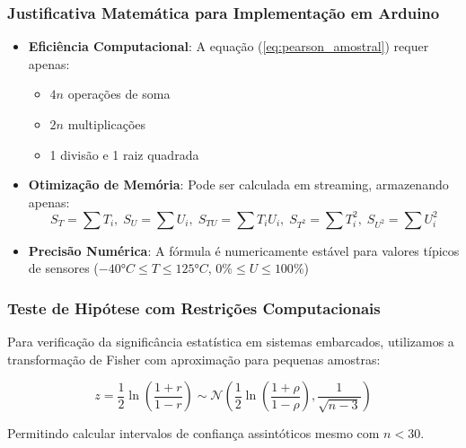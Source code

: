 \documentclass[12pt, a4paper]{article}
\begin{document}
\subsubsection{Justificativa Matemática para Implementação em Arduino}
\begin{itemize}
    \item \textbf{Eficiência Computacional}: A equação (\ref{eq:pearson_amostral}) requer apenas:
        \begin{itemize}
            \item $4n$ operações de soma
            \item $2n$ multiplicações
            \item 1 divisão e 1 raiz quadrada
        \end{itemize}
    \item \textbf{Otimização de Memória}: Pode ser calculada em streaming, armazenando apenas:
        \begin{equation}
            S_T = \sum T_i,\; S_U = \sum U_i,\; S_{TU} = \sum T_iU_i,\; S_{T^2} = \sum T_i^2,\; S_{U^2} = \sum U_i^2
        \end{equation}
    \item \textbf{Precisão Numérica}: A fórmula é numericamente estável para valores típicos de sensores ($-40°C \leq T \leq 125°C$, $0\% \leq U \leq 100\%$)
\end{itemize}

\subsubsection{Teste de Hipótese com Restrições Computacionais}
Para verificação da significância estatística em sistemas embarcados, utilizamos a transformação de Fisher com aproximação para pequenas amostras:

\begin{equation}
    z = \frac{1}{2}\ln\left(\frac{1+r}{1-r}\right) \sim \mathcal{N}\left(\frac{1}{2}\ln\left(\frac{1+\rho}{1-\rho}\right), \frac{1}{\sqrt{n-3}}\right)
    \label{eq:fisher}
\end{equation}

\noindent Permitindo calcular intervalos de confiança assintóticos mesmo com $n < 30$.
\end{document}
